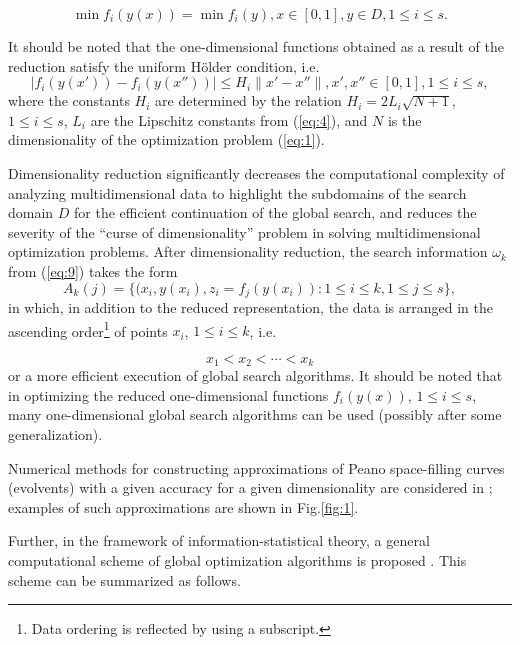 \documentclass[review]{elsarticle}
\begin{document}
\begin{equation}\label{eq:11}
\min {f_i (y(x))} = \min{f_i (y)}, x \in [0,1], y \in D, 1 \leq i \leq s.
\end{equation}

It should be noted that the one-dimensional functions obtained as a result of the reduction satisfy the uniform H\"older condition, i.e.
\begin{equation}\label{eq:12}
|f_i (y(x'))-f_i (y(x''))| \leq H_i \|x'-x''\|, x',x''\in [0,1], 1 \leq i \leq s,
\end{equation}
where the constants $H_i$ are determined by the relation $H_i = 2L_i \sqrt{N+1}$, ${1 \leq i \leq s}$, $L_i$ are the Lipschitz constants from (\ref{eq:4}), and $N$ is the dimensionality of the optimization problem (\ref{eq:1}).

Dimensionality reduction significantly decreases the computational complexity of analyzing multidimensional data to highlight the subdomains of the search domain $D$ for the efficient continuation of the global search, and reduces the severity of the ``curse of dimensionality'' problem in solving multidimensional optimization problems. After dimensionality reduction, the search information $\omega_k$ from (\ref{eq:9}) takes the form
\begin{equation}\label{eq:13}
A_k (j)=\{ (x_i, y(x_i), z_i=f_j (y(x_i) ): 1 \leq i \leq k,1 \leq j \leq s \},
\end{equation}
in which, in addition to the reduced representation, the data is arranged in the ascending order\footnote{Data ordering is reflected by using a subscript.} of points $x_i$,  $1 \leq i \leq k$, i.e.

\begin{equation}\label{eq:14}
x_1< x_2< \cdots < x_k
\end{equation}
or a more efficient execution of global search algorithms. It should be noted that in optimizing the reduced one-dimensional functions $f_i (y(x))$, $1 \leq i \leq s$, many one-dimensional global search algorithms can be used (possibly after some generalization).

Numerical methods for constructing approximations of Peano space-filling curves (evolvents) with a given accuracy for a given dimensionality are considered in \cite{c6}; examples of such approximations are shown in Fig.\ref{fig:1}.

Further, in the framework of information-statistical theory, a general computational scheme of global optimization algorithms is proposed \cite{c6}. This scheme can be summarized as follows.
\end{document}
